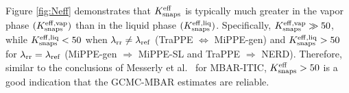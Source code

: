 \documentclass[journal=jced,manuscript=article]{achemso}
\begin{document}


Figure \ref{fig:Neff} demonstrates that $K_{\rm snaps}^{\rm eff}$ is typically much greater in the vapor phase $(K_{\rm snaps}^{\rm eff, vap})$ than in the liquid phase $(K_{\rm snaps}^{\rm eff, liq})$. Specifically, $K_{\rm snaps}^{\rm eff, vap} \gg 50$, while $K_{\rm snaps}^{\rm eff, liq} < 50$ when $\lambda_{\rm rr} \neq \lambda_{\rm ref}$ (TraPPE $\Leftrightarrow$ MiPPE-gen) and $K_{\rm snaps}^{\rm eff, liq} > 50$ for $\lambda_{\rm rr} = \lambda_{\rm ref}$ (MiPPE-gen $\Rightarrow$ MiPPE-SL and TraPPE $\Rightarrow$ NERD). Therefore, similar to the conclusions of Messerly et al.~\cite{Postdoc_1} for MBAR-ITIC, $K_{\rm snaps}^{\rm eff} > 50$ is a good indication that the GCMC-MBAR estimates are reliable. 
\end{document}
